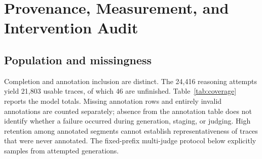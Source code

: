 \section{Provenance, Measurement, and Intervention Audit}
\label{app:audit}
\subsection{Population and missingness}
\begin{table}[t]
\centering\small
\caption{Atlas inclusion, out of 3,488 attempted generations per reasoning model. ``Usable'' means at least one segment passes both contextual and isolated parsing checks. ``Unfinished'' counts unfinished attempts within the usable population. The last column is the fraction of annotated segments retained, not coverage of unannotated text. The companion \protect{} reports all 56 model--domain denominators, including attempted, completed, annotated, usable, and excluded counts.}
\label{tab:coverage}
\end{table}
Completion and annotation inclusion are distinct. The 24,416 reasoning attempts yield 21,803 usable traces, of which 46 are unfinished. Table~\ref{tab:coverage} reports the model totals. Missing annotation rows and entirely invalid annotations are counted separately; absence from the annotation table does not identify whether a failure occurred during generation, staging, or judging. High retention among annotated segments cannot establish representativeness of traces that were never annotated. The fixed-prefix multi-judge protocol below explicitly samples from attempted generations.

